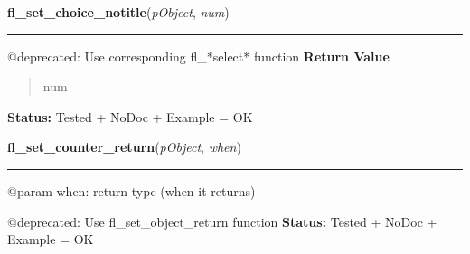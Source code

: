     \vspace{0.5ex}

\hspace{.8\funcindent}\begin{boxedminipage}{\funcwidth}

    \raggedright \textbf{fl\_set\_choice\_notitle}(\textit{pObject}, \textit{num})

    \vspace{-1.5ex}

    \rule{\textwidth}{0.5\fboxrule}
\setlength{\parskip}{2ex}

@deprecated: Use corresponding fl\_*select* function
\setlength{\parskip}{1ex}
      \textbf{Return Value}
    \vspace{-1ex}

      \begin{quote}

num
      \end{quote}

\textbf{Status:} 
Tested + NoDoc + Example = OK


    \end{boxedminipage}

    \label{xformslib:deprecated:fl_set_counter_return}

    \vspace{0.5ex}

\hspace{.8\funcindent}\begin{boxedminipage}{\funcwidth}

    \raggedright \textbf{fl\_set\_counter\_return}(\textit{pObject}, \textit{when})

    \vspace{-1.5ex}

    \rule{\textwidth}{0.5\fboxrule}
\setlength{\parskip}{2ex}

@param when: return type (when it returns)

@deprecated: Use fl\_set\_object\_return function
\setlength{\parskip}{1ex}
\textbf{Status:} 
Tested + NoDoc + Example = OK


    \end{boxedminipage}

    \label{xformslib:deprecated:fl_add_menu}

